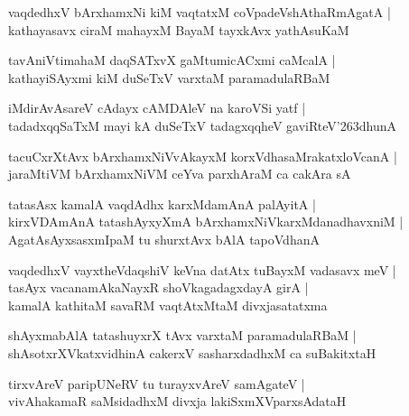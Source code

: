 \begin{shloka}
vaqdedhxV bArxhamxNi kiM vaqtatxM coVpadeVshAthaRmAgatA |\\
kathayasavx ciraM mahayxM BayaM tayxkAvx yathAsuKaM
\end{shloka}

\begin{shloka}
tavAniVtimahaM daqSATxvX gaMtumicACxmi caMcalA |\\
kathayiSAyxmi kiM duSeTxV varxtaM paramadulaRBaM
\end{shloka}

\begin{shloka}
iMdirAvAsareV cAdayx cAMDAleV na karoVSi yatf |\\
tadadxqqSaTxM mayi kA duSeTxV tadagxqqheV gaviRteV\char'263dhunA
\end{shloka}

\begin{shloka}
tacuCxrXtAvx bArxhamxNiVvAkayxM korxVdhasaMrakatxloVcanA |\\
jaraMtiVM bArxhamxNiVM ceYva parxhAraM ca cakAra sA
\end{shloka}

\begin{shloka}
tatasAsx kamalA vaqdAdhx karxMdamAnA palAyitA |\\
kirxVDAmAnA tatashAyxyXmA bArxhamxNiVkarxMdanadhavxniM |\\
AgatAsAyxsasxmIpaM tu shurxtAvx bAlA tapoVdhanA
\end{shloka}

\begin{shloka}
vaqdedhxV vayxtheVdaqshiV keVna datAtx tuBayxM vadasavx meV |\\
tasAyx vacanamAkaNayxR shoVkagadagxdayA girA |\\
kamalA kathitaM savaRM vaqtAtxMtaM divxjasatatxma
\end{shloka}

\begin{shloka}
shAyxmabAlA tatashuyxrX tAvx varxtaM paramadulaRBaM |\\
shAsotxrXVkatxvidhinA cakerxV sasharxdadhxM ca suBakitxtaH
\end{shloka}

\begin{shloka}
tirxvAreV paripUNeRV tu turayxvAreV samAgateV |\\
vivAhakamaR saMsidadhxM divxja lakiSxmXVparxsAdataH
\end{shloka}

